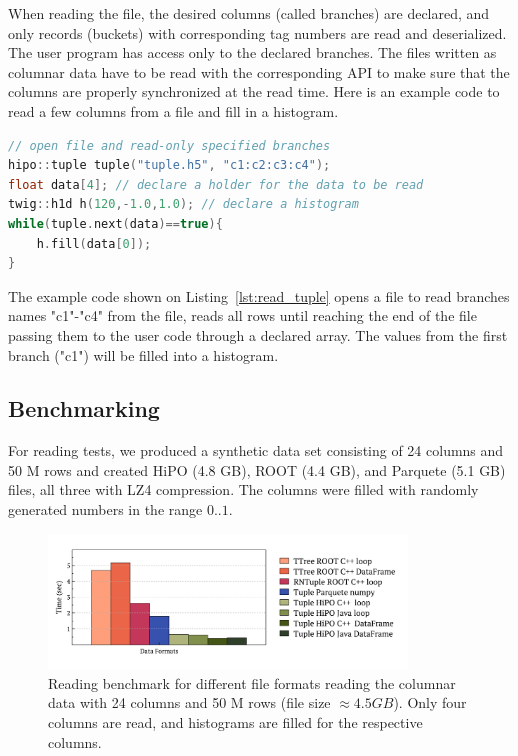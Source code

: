 When reading the file, the desired columns (called branches) are declared, and only records (buckets) with corresponding tag numbers are read and deserialized.
The user program has access only to the declared branches. The files written as columnar data have to be read with the corresponding API to make sure that the columns 
are properly synchronized at the read time. Here is an example code to read a few columns from a file and fill in a histogram. 
\begin{lstlisting}[language=c++, caption=c++ example to read HiPO tuple file and fill a histogram., label=lst:read_tuple]
// open file and read-only specified branches
hipo::tuple tuple("tuple.h5", "c1:c2:c3:c4"); 
float data[4]; // declare a holder for the data to be read
twig::h1d h(120,-1.0,1.0); // declare a histogram
while(tuple.next(data)==true){
    h.fill(data[0]);
}
\end{lstlisting}

The example code shown on Listing~\ref{lst:read_tuple} opens a file to read branches names "c1"-"c4" from the file, reads all rows until reaching the end of the file passing them to the user code through a declared array. The values from the first branch ("c1") will be filled into a histogram.

\subsection{Benchmarking}

For reading tests, we produced a synthetic data set consisting of 24 columns and 50 M rows and created HiPO (4.8 GB), ROOT (4.4 GB), and Parquete (5.1 GB) files, all three with LZ4 compression. The columns were filled with randomly generated numbers in the range $0..1$. 

\begin{figure}[h!]
  \begin{center}
    \includegraphics[width=0.85\textwidth]{images/benchmark_final.pdf}
 \end{center}
  \caption{Reading benchmark for different file formats reading the columnar data with 24 columns and 50 M rows (file size $\approx 4.5 GB$). Only four columns are read, and histograms are filled for the respective columns. }
 \label{read_benchmark}
\end{figure}

